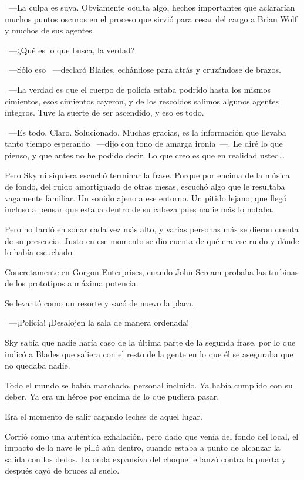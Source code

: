 ~---La culpa es suya. Obviamente oculta algo, hechos importantes que aclararían muchos puntos oscuros en el proceso que sirvió para cesar del cargo a Brian Wolf y muchos de sus agentes.

~---¿Qué es lo que busca, la verdad?

~---Sólo eso ~---declaró Blades, echándose para atrás y cruzándose de brazos.

~---La verdad es que el cuerpo de policía estaba podrido hasta los mismos cimientos, esos cimientos cayeron, y de los rescoldos salimos algunos agentes íntegros. Tuve la suerte de ser ascendido, y eso es todo.

~---Es todo. Claro. Solucionado. Muchas gracias, es la información que llevaba tanto tiempo esperando ~---dijo con tono de amarga ironía~---. Le diré lo que pienso, y que antes no he podido decir. Lo que creo es que en realidad usted\dots

Pero Sky ni siquiera escuchó terminar la frase. Porque por encima de la música de fondo, del ruido amortiguado de otras mesas, escuchó algo que le resultaba vagamente familiar. Un sonido ajeno a ese entorno. Un pitido lejano, que llegó incluso a pensar que estaba dentro de su cabeza pues nadie más lo notaba.

Pero no tardó en sonar cada vez más alto, y varias personas más se dieron cuenta de su presencia. Justo en ese momento se dio cuenta de qué era ese ruido y dónde lo había escuchado.

Concretamente en Gorgon Enterprises, cuando John Scream probaba las turbinas de los prototipos a máxima potencia.

Se levantó como un resorte y sacó de nuevo la placa.

~---¡Policía! ¡Desalojen la sala de manera ordenada!

Sky sabía que nadie haría caso de la última parte de la segunda frase, por lo que indicó a Blades que saliera con el resto de la gente en lo que él se aseguraba que no quedaba nadie.

Todo el mundo se había marchado, personal incluido. Ya había cumplido con su deber. Ya era un héroe por encima de lo que pudiera pasar.

Era el momento de salir cagando leches de aquel lugar.

Corrió como una auténtica exhalación, pero dado que venía del fondo del local, el impacto de la nave le pilló aún dentro, cuando estaba a punto de alcanzar la salida con los dedos. La onda expansiva del choque le lanzó contra la puerta y después cayó de bruces al suelo.

